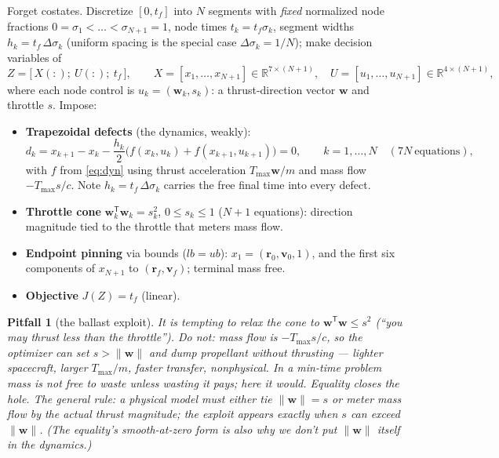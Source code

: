 \documentclass[11pt,letterpaper]{article}
\theoremstyle{noteplain}
\newtheorem*{pitfall}{Pitfall}
\newcommand{\R}{\mathbb{R}}
\newcommand{\T}{^{\mathsf{T}}}
\newcommand{\rvec}{\mathbf{r}}
\newcommand{\vvec}{\mathbf{v}}
\begin{document}
Forget costates. Discretize $[0,t_f]$ into $N$ segments with \emph{fixed}
normalized node fractions $0 = \sigma_1 < \dots < \sigma_{N+1} = 1$, node
times $t_k = t_f\sigma_k$, segment widths
$h_k = t_f\,\Delta\sigma_k$ (uniform spacing is the special case
$\Delta\sigma_k = 1/N$); make decision variables of
\[
  Z = \bigl[\,X(:);\ U(:);\ t_f\,\bigr],\qquad
  X = [x_1,\dots,x_{N+1}] \in \R^{7\times(N+1)},\quad
  U = [u_1,\dots,u_{N+1}] \in \R^{4\times(N+1)},
\]
where each node control is $u_k = (\mathbf w_k, s_k)$: a thrust-direction
vector $\mathbf w$ and throttle $s$. Impose:
\begin{itemize}[leftmargin=1.6em]
  \item \textbf{Trapezoidal defects} (the dynamics, weakly):
  \[
    d_k = x_{k+1} - x_k - \frac{h_k}{2}\bigl(f(x_k,u_k) + f(x_{k+1},u_{k+1})\bigr)
    = 0, \qquad k = 1,\dots,N \quad (7N\ \text{equations}),
  \]
  with $f$ from \eqref{eq:dyn} using thrust acceleration
  $T_{\max}\mathbf w/m$ and mass flow $-T_{\max}s/c$. Note
  $h_k = t_f\,\Delta\sigma_k$ carries the free final time into every
  defect.
  \item \textbf{Throttle cone} $\mathbf w_k\T\mathbf w_k = s_k^2$,
  $0 \le s_k \le 1$ ($N{+}1$ equations): direction magnitude tied to the
  throttle that meters mass flow.
  \item \textbf{Endpoint pinning} via bounds ($lb = ub$): $x_1 = (\rvec_0,
  \vvec_0, 1)$, and the first six components of $x_{N+1}$ to
  $(\rvec_f,\vvec_f)$; terminal mass free.
  \item \textbf{Objective} $J(Z) = t_f$ (linear).
\end{itemize}

\begin{pitfall}[the ballast exploit]
It is tempting to relax the cone to
$\mathbf w\T\mathbf w \le s^2$ (``you may thrust less than the throttle'').
Do not: mass flow is $-T_{\max}s/c$, so the optimizer can set
$s > \|\mathbf w\|$ and \emph{dump propellant without thrusting} --- lighter
spacecraft, larger $T_{\max}/m$, faster transfer, nonphysical. In a
min-time problem mass is not free to waste \emph{unless wasting it pays};
here it would. Equality closes the hole. The general rule: a physical model must
either tie $\|\mathbf w\| = s$ or meter mass flow by the \emph{actual}
thrust magnitude; the exploit appears exactly when $s$ can exceed
$\|\mathbf w\|$. (The equality's smooth-at-zero form is also why we don't
put $\|\mathbf w\|$ itself in the dynamics.)
\end{pitfall}
\end{document}
